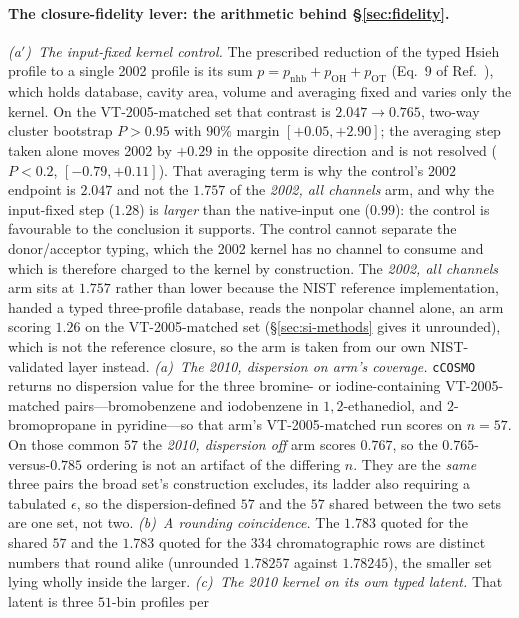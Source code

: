 \paragraph{The closure-fidelity lever: the arithmetic behind \S\ref{sec:fidelity}.}
\emph{(a$'$)~The input-fixed kernel control.} The prescribed reduction of the typed Hsieh profile to
a single 2002 profile is its sum $p=p_{\mathrm{nhb}}+p_{\mathrm{OH}}+p_{\mathrm{OT}}$ (Eq.~9 of
Ref.~\cite{bell2020cosmosac}), which holds database, cavity area, volume and averaging fixed and
varies only the kernel. On the VT-2005-matched set that contrast is $2.047\to0.765$, two-way cluster bootstrap
$P>0.95$ with $90\%$ margin $[+0.05,+2.90]$; the averaging step taken alone moves 2002 by $+0.29$ in
the opposite direction and is not resolved ($P<0.2$, $[-0.79,+0.11]$). That averaging term is why
the control's $2002$ endpoint is $2.047$ and not the $1.757$ of the \emph{2002, all channels} arm, and why
the input-fixed step ($1.28$) is \emph{larger} than the native-input one ($0.99$): the control is
favourable to the conclusion it supports. The control cannot separate
the donor/acceptor typing, which the 2002 kernel has no channel to consume and which is therefore
charged to the kernel by construction. The \emph{2002, all channels} arm sits at $1.757$ rather
than lower because the NIST reference implementation, handed a typed three-profile
database, reads the nonpolar channel alone, an arm scoring $1.26$ on the VT-2005-matched set
(\S\ref{sec:si-methods} gives it unrounded), which is not the reference closure, so the arm is taken
from our own NIST-validated layer instead.
\emph{(a)~The \emph{2010, dispersion on} arm's coverage.} \texttt{cCOSMO} returns no dispersion value for the three
bromine- or iodine-containing VT-2005-matched pairs---bromobenzene and iodobenzene in $1,2$-ethanediol, and
$2$-bromopropane in pyridine---so that arm's VT-2005-matched run scores on $n{=}57$. On those common $57$ the
\emph{2010, dispersion off} arm scores $0.767$, so the $0.765$-versus-$0.785$ ordering is not an artifact of the
differing $n$. They are the \emph{same} three pairs the broad set's construction excludes, its ladder
also requiring a tabulated $\epsilon$, so the dispersion-defined $57$ and the $57$ shared between the
two sets are one set, not two. \emph{(b)~A rounding coincidence.} The $1.783$ quoted for the shared
$57$ and the $1.783$ quoted for the $334$ chromatographic rows are distinct numbers that round alike
(unrounded $1.78257$ against $1.78245$), the smaller set lying wholly inside the larger.
\emph{(c)~The 2010 kernel on its own typed latent.} That latent is three $51$-bin profiles per

